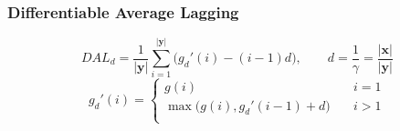 \documentclass[landscape]{article}
\begin{document}
\subsubsection*{Differentiable Average Lagging}
\begin{equation}\nonumber
	DAL_d = \frac{1}{| \mathbf{y} |} \sum_{i=1}^{| \mathbf{y} |} \bigg(g_d\prime(i) - (i-1)d \bigg), \qquad d = \frac{1}{\gamma} = \frac{| \mathbf{x} |}{| \mathbf{y} |}
\end{equation}
\begin{equation}\nonumber
g_d\prime(i) = \left\{
		\begin{array}{ll}
			g(i) & \quad i = 1\\
			\max \bigg( g(i), g_d\prime(i-1)+d\bigg) & \quad i > 1\\
		\end{array}
	\right.
\end{equation}
\end{document}
